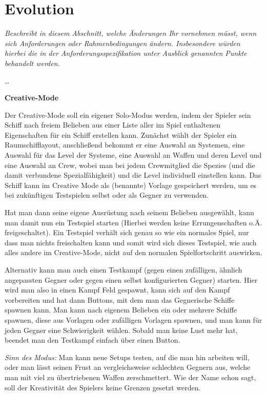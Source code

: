 \documentclass[fontsize=12pt,paper=a4,twoside]{scrartcl}
\begin{document}
\section{Evolution} \label{sec:evolution}

{\itshape Beschreibt in diesem Abschnitt, welche Änderungen Ihr vornehmen müsst,
wenn sich Anforderungen oder Rahmenbedingungen ändern. Insbesondere würden 
hierbei die in der Anforderungsspezifikation unter \glqq{}Ausblick\grqq{} 
genannten Punkte behandelt werden.}

\dots

\textbf{Creative-Mode}
{
Der Creative-Mode soll ein eigener Solo-Modus werden, indem der Spieler sein Schiff nach freiem Belieben aus einer Liste aller im Spiel enthaltenen Eigenschaften für ein Schiff erstellen kann. Zunächst wählt der Spieler ein Raumschifflayout, anschließend bekommt er eine Auswahl an Systemen, eine Auswahl für das Level der Systeme, eine Auswahl an Waffen und deren Level und eine Auswahl an Crew, wobei man bei jedem Crewmitglied die Spezies (und die damit verbundene Spezialfähigkeit) und die Level individuell einstellen kann. 
Das Schiff kann im Creative Mode als (benannte) Vorlage gespeichert werden, um es bei zukünftigen Testspielen selbst oder als Gegner zu verwenden.

Hat man dann seine eigene Ausrüstung nach seinem Belieben ausgewählt, kann man damit nun ein Testspiel starten (Hierbei werden keine Errungenschaften o.Ä. freigeschaltet). Ein Testspiel verhält sich genau so wie ein normales Spiel, nur dass man nichts freischalten kann und somit wird sich dieses Testspiel, wie auch alles andere im Creative-Mode, nicht auf den normalen Spielfortschritt auswirken. 

Alternativ kann man auch einen Testkampf (gegen einen zufälligen, ähnlich angepassten Gegner oder gegen einen selbst konfigurierten Gegner) starten. Hier wird man also in einen Kampf Feld gespawnt, kann sich auf den Kampf vorbereiten und hat dann Buttons, mit dem man das Gegnerische Schiffe spawnen kann. Man kann nach eigenem Belieben ein oder mehrere Schiffe spawnen, diese aus Vorlagen oder zufälligen Vorlagen spawnen, und man kann für jeden Gegner eine Schwierigkeit wählen. Sobald man keine Lust mehr hat, beendet man den Testkampf einfach über einen Button. 

\textit{Sinn des Modus:}
Man kann neue Setups testen, auf die man hin arbeiten will, oder man lässt seinen Frust an vergleichsweise schlechten Gegnern aus, welche man mit viel zu übertriebenen Waffen zerschmettert. Wie der Name schon sagt, soll der Kreativität des Spielers keine Grenzen gesetzt werden.  

}
\end{document}
